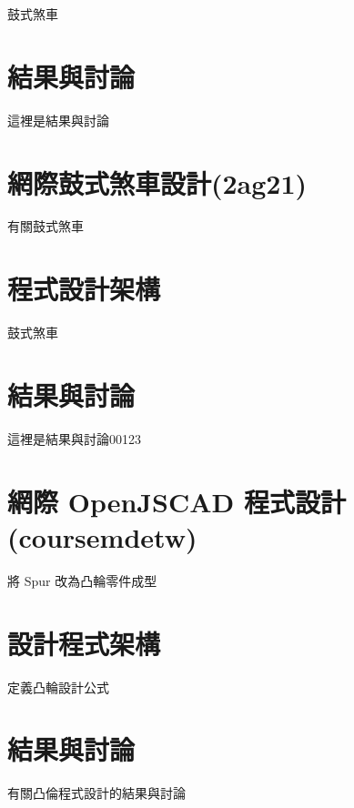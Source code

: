 \documentclass[]{article}
\begin{document}
鼓式煞車

\section{結果與討論}\label{ux7d50ux679cux8207ux8a0eux8ad6-13}

這裡是結果與討論

\section{網際鼓式煞車設計(2ag21)}\label{ux7db2ux969bux9f13ux5f0fux715eux8ecaux8a2dux8a082ag21}

有關鼓式煞車

\section{程式設計架構}\label{ux7a0bux5f0fux8a2dux8a08ux67b6ux69cb-13}

鼓式煞車

\section{結果與討論}\label{ux7d50ux679cux8207ux8a0eux8ad6-14}

這裡是結果與討論00123

\section{網際 OpenJSCAD
程式設計(coursemdetw)}\label{ux7db2ux969b-openjscad-ux7a0bux5f0fux8a2dux8a08coursemdetw}

將 Spur 改為凸輪零件成型

\section{設計程式架構}\label{ux8a2dux8a08ux7a0bux5f0fux67b6ux69cb-1}

定義凸輪設計公式

\section{結果與討論}\label{ux7d50ux679cux8207ux8a0eux8ad6-15}

有關凸倫程式設計的結果與討論
\end{document}
